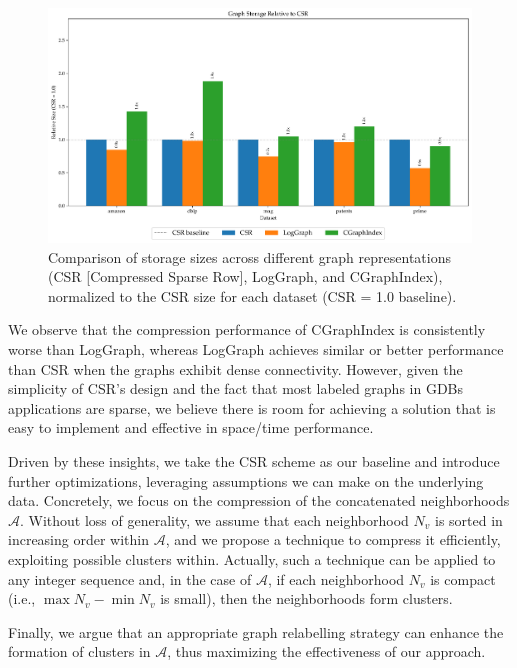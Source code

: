 \begin{figure}[h]
    \centering
    \includegraphics[width=\linewidth]{plots/adj_size_preliminary.pdf}
    \caption{
Comparison of storage sizes across different graph representations (CSR [Compressed Sparse Row], LogGraph, and CGraphIndex), normalized to the CSR size for each dataset (CSR = 1.0 baseline).
}
    \label{fig:preliminar_analysis}
\end{figure}


We observe that the compression performance of CGraphIndex is consistently worse than LogGraph, whereas LogGraph achieves similar or better performance than CSR when the graphs exhibit dense connectivity. However, given the simplicity of CSR's design and the fact that most labeled graphs in GDBs applications are sparse, we believe there is room for achieving a solution that is easy to implement and effective in space/time performance.

Driven by these insights, we take the CSR scheme as our baseline and introduce further optimizations, leveraging assumptions we can make on the underlying data. Concretely, we focus on the compression of the concatenated neighborhoods $\mathcal A$. Without loss of generality, we assume that each neighborhood $N_v$ is sorted in increasing order within $\mathcal A$, and we propose a technique to compress it efficiently, exploiting possible clusters within.  Actually, such a technique can be applied to any integer sequence and, in the case of $\mathcal{A}$, if each neighborhood $N_v$ is compact (i.e., $\max N_v - \min N_v$ is small),  then the neighborhoods form clusters.

Finally, we argue that an appropriate graph relabelling strategy can enhance the formation of clusters in $\mathcal{A}$, thus maximizing the effectiveness of our approach.

